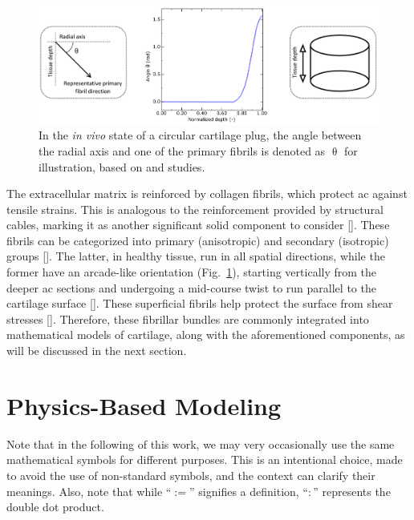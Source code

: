\begin{figure}
\centering
\includegraphics[width=0.9\linewidth]{arcade.jpg}
\caption{In the \emph{in vivo} state of a circular cartilage plug, the angle between the radial axis and one of the primary fibrils is denoted as 
$\uptheta$ for illustration, based on \cite{benninghoff1925} and \cite{wilson2004a} studies.
\label{arcade}}
\end{figure}
%
The extracellular matrix is reinforced by collagen fibrils, which protect \ac{ac} against tensile strains. This is analogous to the reinforcement provided by structural cables, marking it as another significant solid component to consider [\cite{laurent2007,bielajew2020}]. These fibrils can be categorized into primary (anisotropic) and secondary (isotropic) groups [\cite{clark1985,wilson2004a}]. The latter, in healthy tissue, run in all spatial directions, while the former have an arcade-like orientation (Fig.~\ref{arcade}), starting vertically from the deeper \ac{ac} sections and undergoing a mid-course twist to run parallel to the cartilage surface [\cite{wilson2004a}]. These superficial fibrils help protect the surface from shear stresses [\cite{shirazi2008,motavalli2014}]. Therefore, these fibrillar bundles are commonly integrated into mathematical models of cartilage, along with the aforementioned components, as will be discussed in the next section.

\section{Physics-Based Modeling}
%
Note that in the following of this work, we may very occasionally use the same mathematical symbols for different purposes. This is an intentional choice, made to avoid the use of non-standard symbols, and the context can clarify their meanings. Also, note that while ``$:=$'' signifies a definition, ``$:$'' represents the double dot product.

